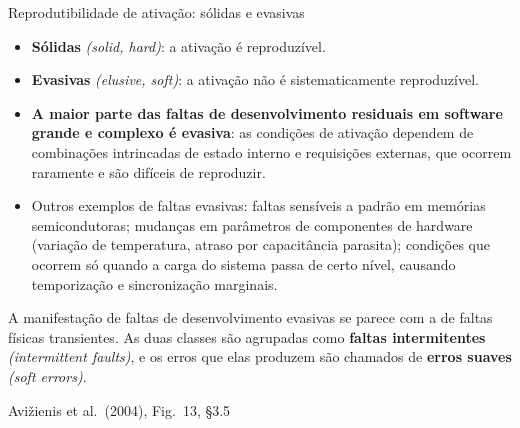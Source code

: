 \documentclass{beamer}
\newcommand{\en}[1]{{\color{depCinza}\textit{#1}}}
\newcommand{\sect}[1]{\par\smallskip\hfill{\tiny\color{black!55}Avi\v{z}ienis et al.\ (2004), #1}}
\begin{document}
\begin{frame}{Reprodutibilidade de ativa\c{c}\~ao: s\'olidas e evasivas}
    \centering
    \diagSolidoIntermitente
    \vspace{0.1em}
    \scriptsize
    \begin{itemize}
        \item \textbf{S\'olidas} \en{(solid, hard)}: a ativa\c{c}\~ao \'e reproduz\'ivel.
        \item \textbf{Evasivas} \en{(elusive, soft)}: a ativa\c{c}\~ao n\~ao \'e sistematicamente reproduz\'ivel.
        \item \textbf{A maior parte das faltas de desenvolvimento residuais em software grande e complexo \'e evasiva}: as condi\c{c}\~oes de ativa\c{c}\~ao dependem de combina\c{c}\~oes intrincadas de estado interno e requisi\c{c}\~oes externas, que ocorrem raramente e s\~ao dif\'iceis de reproduzir.
        \item Outros exemplos de faltas evasivas: faltas sens\'iveis a padr\~ao em mem\'orias semicondutoras; mudan\c{c}as em par\^ametros de componentes de hardware (varia\c{c}\~ao de temperatura, atraso por capacit\^ancia parasita); condi\c{c}\~oes que ocorrem s\'o quando a carga do sistema passa de certo n\'ivel, causando temporiza\c{c}\~ao e sincroniza\c{c}\~ao marginais.
    \end{itemize}
    \smallskip
    \begin{defi}
        \scriptsize
        A manifesta\c{c}\~ao de faltas de desenvolvimento evasivas se parece com a de faltas f\'isicas transientes. As duas classes s\~ao agrupadas como \textbf{faltas intermitentes} \en{(intermittent faults)}, e os erros que elas produzem s\~ao chamados de \textbf{erros suaves} \en{(soft errors)}.
    \end{defi}
    \sect{Fig.\ 13, \S3.5}
\end{frame}
\end{document}
